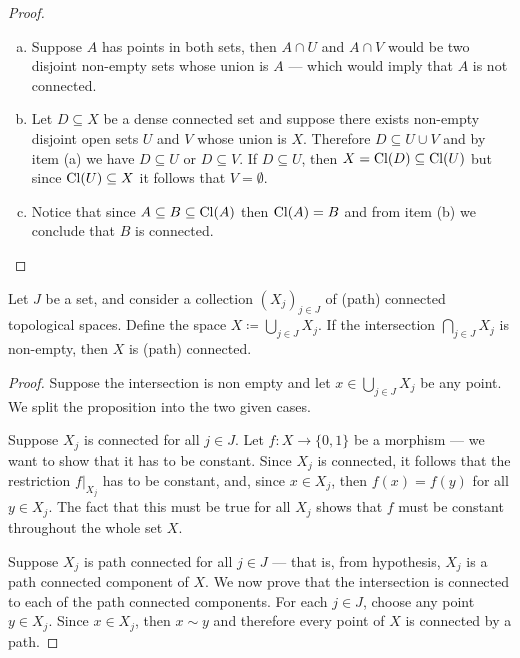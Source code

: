 \begin{proof}
\begin{enumerate}[(a)]\setlength\itemsep{0em}
\item Suppose \(A\) has points in both sets, then \(A \cap U\) and \(A \cap V\)
  would be two disjoint non-empty sets whose union is \(A\) --- which would
  imply that \(A\) is not connected.

\item Let \(D \subseteq X\) be a dense connected set and suppose there exists
  non-empty disjoint open sets \(U\) and \(V\) whose union is \(X\). Therefore
  \(D \subseteq U \cup V\) and by item (a) we have \(D \subseteq U\) or \(D
  \subseteq V\). If \(D \subseteq U\), then \(X = \operatorname{Cl}(D) \subseteq \operatorname{Cl}(U)\) but
  since \(\operatorname{Cl}(U) \subseteq X\) it follows that \(V = \emptyset\).

\item Notice that since \(A \subseteq B \subseteq \operatorname{Cl}(A)\) then \(\operatorname{Cl}(A) = B\)
  and from item (b) we conclude that \(B\) is connected.
\end{enumerate}
\end{proof}

\begin{proposition}
\label{prop:union-path-connected}
Let \(J\) be a set, and consider a collection \((X_j)_{j \in J}\) of (path)
connected topological spaces. Define the space
\(X \coloneq \bigcup_{j \in J} X_j\). If the intersection
\(\bigcap_{j \in J} X_j\) is non-empty, then \(X\) is (path) connected.
\end{proposition}

\begin{proof}
Suppose the intersection is non empty and let \(x \in \bigcup_{j \in J}
X_j\) be any point. We split the proposition into the two given cases.

Suppose \(X_j\) is connected for all \(j \in J\). Let \(f: X \to \{0, 1\}\) be a
morphism --- we want to show that it has to be constant. Since \(X_j\) is
connected, it follows that the restriction \(f|_{X_j}\) has to be constant, and,
since \(x \in X_j\), then \(f(x) = f(y)\) for all \(y \in X_j\). The fact that
this must be true for all \(X_j\) shows that \(f\) must be constant throughout
the whole set \(X\).

Suppose \(X_j\) is path connected for all \(j \in J\) --- that is, from
hypothesis, \(X_j\) is a path connected component of \(X\). We now prove that
the intersection is connected to each of the path connected components. For each
\(j \in J\), choose any point \(y \in X_j\). Since \(x \in X_j\), then
\(x \sim y\) and therefore every point of \(X\) is connected by a path.
\end{proof}

